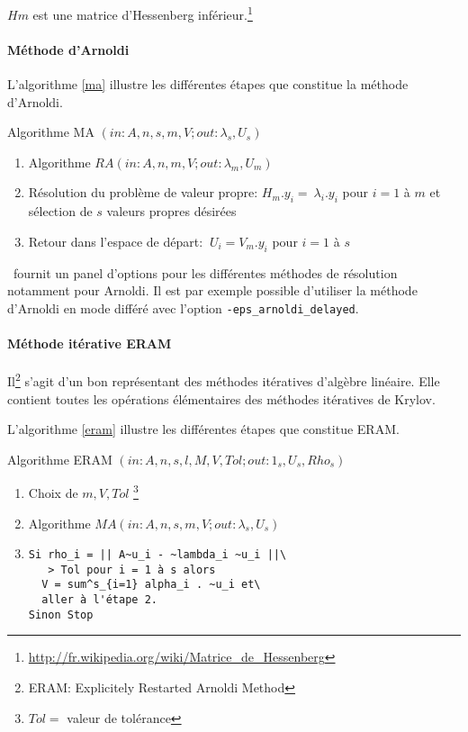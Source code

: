 $Hm$ est une matrice d'Hessenberg inférieur.\footnote{\url{http://fr.wikipedia.org/wiki/Matrice_de_Hessenberg}}

\paragraph{Méthode d'Arnoldi}

L'algorithme \ref{ma} illustre les différentes étapes que constitue la méthode d'Arnoldi.

\begin{algorithm}[h]
  \caption{Algorithme MA $(in:A,n,s,m,V;out:\lambda_s,U_s)$}
  \label{ma}
  \begin{enumerate}
  \item Algorithme $RA(in:A,n,m,V;out:\lambda_m,U_m)$
  \item Résolution du problème de valeur propre: $H_m.y_i = ~\lambda_i.y_i$ pour $i = 1$ à $m$ et sélection de $s$ valeurs propres désirées
  \item Retour dans l'espace de départ: $~U_i = V_m.y_i$ pour $i = 1$ à $s$
  \end{enumerate}
\end{algorithm}

\slepc\ fournit un panel d'options pour les différentes méthodes de résolution notamment pour Arnoldi. Il est par exemple possible d'utiliser la méthode d'Arnoldi en mode différé avec l'option \verb#-eps_arnoldi_delayed#.

\paragraph{Méthode itérative ERAM}

Il\footnote{ERAM: Explicitely Restarted Arnoldi Method} s'agit d'un bon représentant des méthodes itératives d'algèbre linéaire. Elle contient toutes les opérations élémentaires des méthodes itératives de Krylov.

L'algorithme \ref{eram} illustre les différentes étapes que constitue ERAM.

\begin{algorithm}[h]
  \caption{Algorithme ERAM $(in:A,n,s,l,M,V,Tol;out: 1_s, U_s, Rho_s)$}
  \label{eram}
  \begin{enumerate}
  \item Choix de $m,V,Tol$ \footnote{$Tol =$ valeur de tolérance}
  \item \label{eram_step2} Algorithme $MA(in: A,n,s,m,V;out:\lambda_s,U_s)$
  \item
\begin{verbatim}
Si rho_i = || A~u_i - ~lambda_i ~u_i ||\
   > Tol pour i = 1 à s alors
  V = sum^s_{i=1} alpha_i . ~u_i et\
  aller à l'étape 2.
Sinon Stop
\end{verbatim}
  \end{enumerate}
\end{algorithm}

